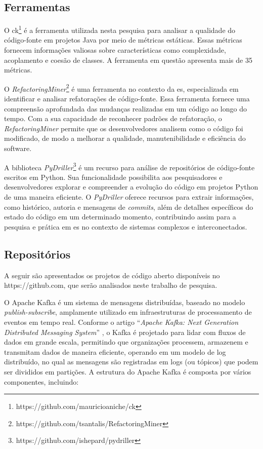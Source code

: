 \subsection{Ferramentas}\label{sec:ferramentas}
O \gls{ck}\footnote{https://github.com/mauricioaniche/ck} \cite{aniche-ck} é a ferramenta utilizada nesta pesquisa para analisar a qualidade do código-fonte em projetos Java \cite{JavaProgrammingLanguage} por meio de métricas estáticas. Essas métricas fornecem informações valiosas sobre características como complexidade, acoplamento e coesão de classes. A ferramenta em questão apresenta mais de 35 métricas.

O \textit{RefactoringMiner}\footnote{https://github.com/tsantalis/RefactoringMiner} \cite{Tsantalis:ICSE:2018:RefactoringMiner} é uma ferramenta no contexto da \gls{es}, especializada em identificar e analisar refatorações de código-fonte. Essa ferramenta fornece uma compreensão aprofundada das mudanças realizadas em um código ao longo do tempo. Com a sua capacidade de reconhecer padrões de refatoração, o \textit{RefactoringMiner} permite que os desenvolvedores analisem como o código foi modificado, de modo a melhorar a qualidade, manutenibilidade e eficiência do software.

A biblioteca \textit{PyDriller}\footnote{https://github.com/ishepard/pydriller}\cite{PyDrillerSpadini2018} é um recurso para análise de repositórios de código-fonte escritos em Python. Sua funcionalidade possibilita aos pesquisadores e desenvolvedores explorar e compreender a evolução do código em projetos Python de uma maneira eficiente. O \textit{PyDriller} oferece recursos para extrair informações, como histórico, autoria e mensagens de \textit{commits}, além de detalhes específicos do estado do código em um determinado momento, contribuindo assim para a pesquisa e prática em \gls{es} no contexto de sistemas complexos e interconectados.

\subsection{Repositórios}\label{sec:repositorios}
A seguir são apresentados os projetos de código aberto disponíveis no https://github.com, que serão analisados neste trabalho de pesquisa.

O Apache Kafka \cite{KafkaGitHub} é um sistema de mensagens distribuídas, baseado no modelo \textit{publish-subscribe}, amplamente utilizado em infraestruturas de processamento de eventos em tempo real. Conforme o artigo ``\textit{Apache Kafka: Next Generation Distributed Messaging System}'' \cite{ApacheKafkaNextGenerationDistributedMessagingSystem:2010}, o Kafka é projetado para lidar com fluxos de dados em grande escala, permitindo que organizações processem, armazenem e transmitam dados de maneira eficiente, operando em um modelo de log distribuído, no qual as mensagens são registradas em logs (ou tópicos) que podem ser divididos em partições. 
A estrutura do Apache Kafka é composta por vários componentes, incluindo:

